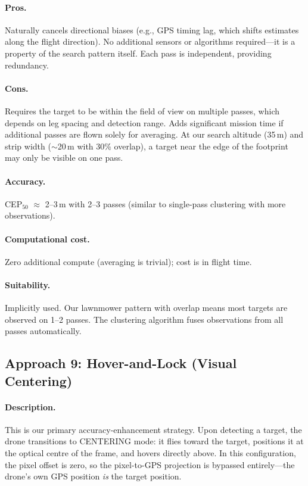 \paragraph{Pros.}
Naturally cancels directional biases (e.g., GPS timing lag, which shifts estimates along the flight direction).  No additional sensors or algorithms required---it is a property of the search pattern itself.  Each pass is independent, providing redundancy.

\paragraph{Cons.}
Requires the target to be within the field of view on multiple passes, which depends on leg spacing and detection range.  Adds significant mission time if additional passes are flown solely for averaging.  At our search altitude (35\,m) and strip width ($\sim$20\,m with 30\% overlap), a target near the edge of the footprint may only be visible on one pass.

\paragraph{Accuracy.}  CEP$_{50}$ $\approx$ 2--3\,m with 2--3 passes (similar to single-pass clustering with more observations).

\paragraph{Computational cost.}  Zero additional compute (averaging is trivial); cost is in flight time.

\paragraph{Suitability.}  Implicitly used.  Our lawnmower pattern with overlap means most targets are observed on 1--2 passes.  The clustering algorithm fuses observations from all passes automatically.

\subsection{Approach 9: Hover-and-Lock (Visual Centering)}\label{sec:approach-hover}

\paragraph{Description.}
This is our primary accuracy-enhancement strategy.  Upon detecting a target, the drone transitions to CENTERING mode: it flies toward the target, positions it at the optical centre of the frame, and hovers directly above.  In this configuration, the pixel offset is zero, so the pixel-to-GPS projection is bypassed entirely---the drone's own GPS position \emph{is} the target position.


